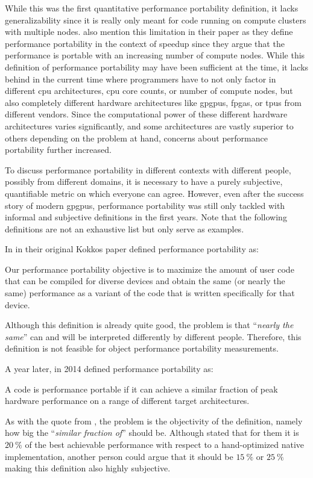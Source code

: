 While this was the first quantitative performance portability definition, it lacks generalizability since it is really only meant for code running on compute clusters with multiple nodes. 
\citeauthor{zhu_performance_2007} also mention this limitation in their paper as they define performance portability in the context of speedup since they argue that the performance is portable with an increasing number of compute nodes. 
While this definition of performance portability may have been sufficient at the time, it lacks behind in the current time where programmers have to not only factor in different \gls{cpu} architectures, \gls{cpu} core counts, or number of compute nodes, but also completely different hardware architectures like \glspl{gpgpu}, \glspl{fpga}, or \glspl{tpu} from different vendors.
Since the computational power of these different hardware architectures varies significantly, and some architectures are vastly superior to others depending on the problem at hand, concerns about performance portability further increased. 

To discuss performance portability in different contexts with different people, possibly from different domains, it is necessary to have a purely subjective, quantifiable metric on which everyone can agree. 
However, even after the success story of modern \glspl{gpgpu}, performance portability was still only tackled with informal and subjective definitions in the first years. 
Note that the following definitions are not an exhaustive list but only serve as examples.

In \citeyear{edwards_kokkos_2013} in their original Kokkos paper \citet{edwards_kokkos_2013} defined performance portability as:
\begin{quotebox}{\citet{edwards_kokkos_2013}}
    Our performance portability objective is to maximize the amount of user code that can be compiled for diverse devices and obtain the same (or nearly the same) performance as a variant of the code that is written specifically for that device.
\end{quotebox}
Although this definition is already quite good, the problem is that \enquote{\textit{nearly the same}} can and will be interpreted differently by different people. 
Therefore, this definition is not feasible for object performance portability measurements.

A year later, in 2014 \citet{kunkel_performance_2014} defined performance portability as:
\begin{quotebox}{\citet{kunkel_performance_2014}}
    A code is performance portable if it can achieve a similar fraction of peak hardware performance on a range of different target architectures.
\end{quotebox}
As with the quote from \citeauthor{edwards_kokkos_2013}, the problem is the objectivity of the definition, namely how big the \enquote{\textit{similar fraction of}} should be. 
Although \citeauthor{kunkel_performance_2014} stated that for them it is $\SI{20}{\percent}$ of the best achievable performance with respect to a hand-optimized native implementation, another person could argue that it should be $\SI{15}{\percent}$ or $\SI{25}{\percent}$ making this definition also highly subjective. 


